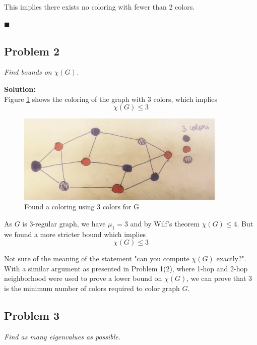 \documentclass[12pt,a4paper]{article}
\newcommand{\rightqed}{
\begin{flushright}
$\blacksquare$
\end{flushright}
}
\newcommand{\solution}{\noindent\textbf{Solution:}\\}
\begin{document}
This implies there exists no coloring with fewer than 2 colors.
\rightqed

\newpage
\subsection*{Problem 2}
\textit{
    Find bounds on $\chi(G)$.
}

\solution
Figure \ref{fig:q_2} shows the coloring of the graph with 3 colors, which implies
\begin{equation}
    \chi(G) \leq 3
\end{equation}
\begin{figure}[H]
    \centering
    \includegraphics[width=10cm]{q_2.jpg}
    \caption{Found a coloring using 3 colors for G}
    \label{fig:q_2}
\end{figure}

As $G$ is 3-regular graph, we have $\mu_1 = 3$ and by Wilf's theorem $\chi(G) \leq 4$. But we found a more stricter bound which implies
\begin{equation}
    \chi(G) \leq 3
\end{equation}

Not sure of the meaning of the statement "can you compute $\chi(G)$ exactly?". With a similar argument as presented in Problem 1(2), where 1-hop and 2-hop neighborhood were used to prove a lower bound on $\chi(G)$, we can prove that 3 is the minimum number of colors required to color graph $G$.

\newpage
\subsection*{Problem 3}
\textit{
    Find as many eigenvalues as possible.
}
\end{document}

